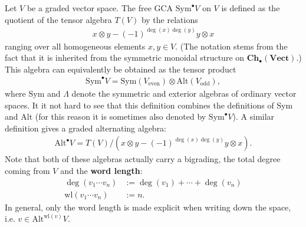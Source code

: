     \begin{example}\label{hda:symmetric_algebra}
        Let $V$ be a graded vector space. The free GCA $\text{Sym}^\bullet V$ on $V$ is defined as the quotient of the tensor algebra $T(V)$ by the relations
        \begin{gather}
            x\otimes y - (-1)^{\deg(x)\deg(y)}y\otimes x
        \end{gather}
        ranging over all homogeneous elements $x,y\in V$. (The notation stems from the fact that it is inherited from the symmetric monoidal structure on $\mathbf{Ch}_\bullet(\mathbf{Vect})$.) This algebra can equivalently be obtained as the tensor product
        \begin{gather}
            \text{Sym}^\bullet V = \text{Sym}(V_{\text{even}})\otimes\text{Alt}(V_{\text{odd}}),
        \end{gather}
        where $\text{Sym}$ and $\Lambda$ denote the symmetric and exterior algebras of ordinary vector spaces. It it not hard to see that this definition combines the definitions of $\text{Sym}$ and $\text{Alt}$ (for this reason it is sometimes also denoted by $\text{Sym}^\bullet V$). A similar definition gives a graded alternating algebra:
        \begin{gather}
            \text{Alt}^\bullet V = T(V)/(x\otimes y - (-1)^{\deg(x)\deg(y)}y\otimes x).
        \end{gather}
        Note that both of these algebras actually carry a bigrading, the total degree coming from $V$ and the \textbf{word length}:
        \begin{align}
            \deg(v_1\cdots v_n) &:= \deg(v_1)+\cdots+\deg(v_n)\\
            \text{wl}(v_1\cdots v_n) &:= n.
        \end{align}
        In general, only the word length is made explicit when writing down the space, i.e. $v\in\text{Alt}^{\text{wl}(v)}V$.
    \end{example}
